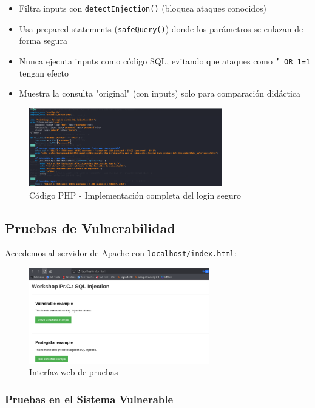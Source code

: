 \documentclass[12pt,a4paper]{article}
\begin{document}
\begin{itemize}
	\item Filtra inputs con \texttt{detectInjection()} (bloquea ataques conocidos)
	\item Usa prepared statements (\texttt{safeQuery()}) donde los parámetros se enlazan
	      de forma segura
	\item Nunca ejecuta inputs como código SQL, evitando que ataques como \texttt{' OR
		      1=1} tengan efecto
	\item Muestra la consulta "original" (con inputs) solo para comparación didáctica
\end{itemize}

\begin{figure}[H]
	\centering
	\includegraphics[width=0.75\textwidth]{./assets/img8.png}
	\caption{Código PHP - Implementación completa del login seguro}
	\label{fig:php-login-completo}
\end{figure}

\subsection{Pruebas de Vulnerabilidad}

Accedemos al servidor de Apache con \texttt{localhost/index.html}:

\begin{figure}[H]
	\centering
	\includegraphics[width=0.7\textwidth]{./assets/img9.png}
	\caption{Interfaz web de pruebas}
	\label{fig:interfaz-web}
\end{figure}

\subsubsection{Pruebas en el Sistema Vulnerable}
\end{document}
